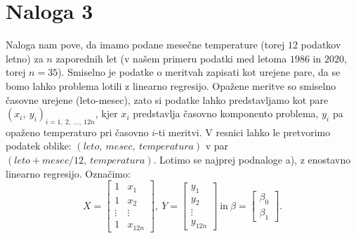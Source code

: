 \documentclass{article}
\begin{document}
\section{Naloga 3}
Naloga nam pove, da imamo podane mesečne temperature (torej $12$ podatkov letno) za $n$ zaporednih let (v našem primeru podatki med letoma $1986$ in $2020$, torej $n = 35$).
Smiselno je podatke o meritvah zapisati kot urejene pare, da se bomo lahko problema lotili z linearno regresijo.
Opažene meritve so smiselno časovne urejene (leto-mesec), zato si podatke lahko predstavljamo kot pare $(x_i,~y_i)_{i=1,~2,~\dots,~12n}$, kjer $x_i$ predstavlja časovno komponento problema, $y_i$ pa opaženo temperaturo pri časovno $i$-ti meritvi. 
V resnici lahko le pretvorimo podatek oblike: $(leto,~mesec,~temperatura)$ v par $(leto + mesec/12,~temperatura)$.
Lotimo se najprej podnaloge a), z enostavno linearno regresijo.
Označimo:
$$
    X = \begin{bmatrix}
        1 & x_1\\ 
        1 & x_2 \\
        \vdots & \vdots\\ 
        1 & x_{12n}
    \end{bmatrix}, ~
    Y = \begin{bmatrix}
        y_1 \\ 
        y_2 \\
        \vdots \\ 
        y_{12n}
    \end{bmatrix}~\text{in}~ 
    \beta = \begin{bmatrix}
        \beta_0 \\ 
        \beta_1
    \end{bmatrix}.   
$$
\end{document}
